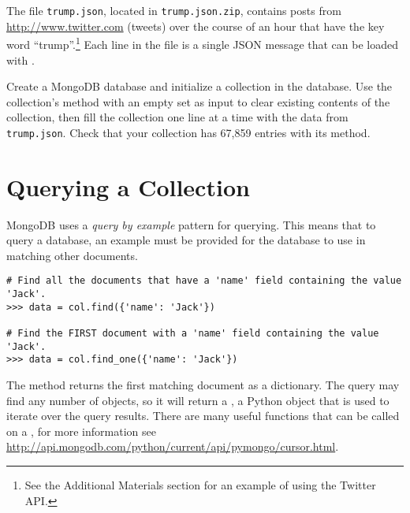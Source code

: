 \begin{problem} %
The file \texttt{trump.json}, located in \texttt{trump.json.zip}, contains posts from \url{http://www.twitter.com} (tweets) over the course of an hour that have the key word ``trump''.\footnote{See the Additional Materials section for an example of using the Twitter API.}
Each line in the file is a single JSON message that can be loaded with .

Create a MongoDB database and initialize a collection in the database.
Use the collection's  method with an empty set as input to clear existing contents of the collection, then fill the collection one line at a time with the data from \texttt{trump.json}.
Check that your collection has 67,859 entries with its  method.
\label{prob:mongo-fill-db}
\end{problem}

\section*{Querying a Collection} %

MongoDB uses a \emph{query by example} pattern for querying.  This means that to query a database, an example must be provided for the database to use in matching other documents.
\begin{lstlisting}
# Find all the documents that have a 'name' field containing the value 'Jack'.
>>> data = col.find({'name': 'Jack'})

# Find the FIRST document with a 'name' field containing the value 'Jack'.
>>> data = col.find_one({'name': 'Jack'})
\end{lstlisting}

The  method returns the first matching document as a dictionary.
The  query may find any number of objects, so it will return a , a Python object that is used to iterate over the query results.
There are many useful functions that can be called on a , for more information see \url{http://api.mongodb.com/python/current/api/pymongo/cursor.html}.

